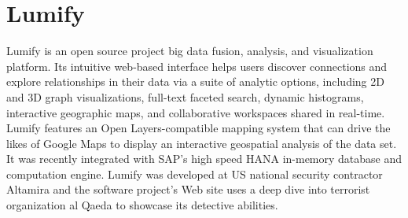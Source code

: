 \section{Lumify}
Lumify is an open source project big data fusion, analysis, and visualization
platform. Its intuitive web-based interface helps users discover connections
and explore relationships in their data via a suite of analytic options,
including 2D and 3D graph visualizations, full-text faceted search, dynamic
histograms, interactive geographic maps, and collaborative workspaces shared in
real-time.\cite{lumify-web} Lumify features an Open Layers-compatible mapping
system that can drive the likes of Google Maps to display an interactive
geospatial analysis of the data set. It was recently integrated with SAP's
high speed HANA in-memory database and computation engine. Lumify was developed
at US national security contractor Altamira and the software project's Web
site uses a deep dive into terrorist organization al Qaeda to showcase its
detective abilities.\cite{lumify-linkedin}
 
